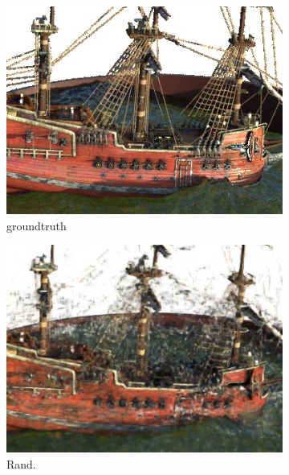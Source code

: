 \begin{figure}[ht!]
    \centering
      \begin{subfigure}{0.19\textwidth}
        \centering   
        \includegraphics[width=\linewidth]{figs/gt_ship.jpg}
          \caption{groundtruth}
          \label{fig:sub1}
      \end{subfigure}   %
      \begin{subfigure}{0.19\textwidth}
        \centering   
        \includegraphics[width=\linewidth]{figs/random_ship.jpg}
          \caption{Rand.}
          \label{fig:sub2}
      \end{subfigure}
      \begin{subfigure}{0.19\textwidth}

\end{subfigure}
\end{figure}
